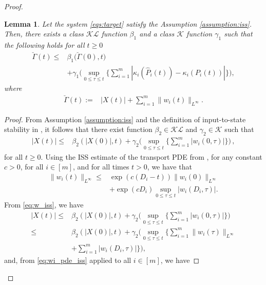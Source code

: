 \documentclass[letterpaper, 10 pt, conference]{ieeeconf}  %
\newtheorem{lemma}[theorem]{Lemma}
\begin{document}
\begin{proof}
\begin{lemma}\label{lem:lemma_3_of_6}
Let the system \eqref{eqs:target} satisfy the Assumption \ref{assumption:iss}. Then, there exists a class $\mathcal{KL}$ function $\beta_1$ and a class $\mathcal{K}$ function $\gamma_1$ such that the following holds for all $t \geq 0$
\begin{align}
    \breve{\Gamma}(t) \leq& \nonumber  \beta_1 \bigg( \breve{\Gamma}(0), t \bigg) \\ &+ \gamma_1 \bigg( \sup_{0 \leq \tau \leq t} \bigg\{ \sum_{i=1}^m |\kappa_i(\hat{P}_i(t)) - \kappa_i(P_i(t))| \bigg\} \bigg), \label{eq:lemma3_Gamma_bar}
\end{align}
where
\begin{align}
    \breve{\Gamma}(t) :=& |X(t)| + \sum_{i=1}^m \|w_i(t)\|_{L^\infty}. \label{eq:Gamma_bar_def}
\end{align}
\end{lemma}
\begin{proof}
From Assumption \ref{assumption:iss} and the definition of input-to-state stability in \cite{SontagISS:1995}, it follows that there exist function $\beta_2 \in \mathcal{KL}$ and $\gamma_2 \in \mathcal{K}$ such that
\begin{align}
    |X(t)| \leq& \beta_2(|X(0)|, t) + \gamma_2 \bigg( \sup_{0 \leq \tau \leq t} \bigg\{ \sum_{i=1}^m |w_i(0,\tau)| \bigg\} \bigg) \label{eq:w_iss}\,, 
\end{align}
for all $t \geq 0$. Using the ISS estimate of the transport PDE from \cite[Lemma 6]{Luke_Peijia:2025}, for any constant $c> 0$, for all $i \in [m]$, and for all times $t > 0$, we have that 
\begin{align}
    \|w_i(t)\|_{L^\infty} \leq& \exp(c(D_i-t)) \|w_i(0)\|_{L^\infty} \nonumber  \\ &+ \exp(cD_i) \sup_{0 \leq \tau \leq t} |w_i(D_i,\tau)|. \label{eq:wi_pde_iss}
\end{align}
From \eqref{eq:w_iss}, we have
\begin{align}
    |X(t)| \leq& \beta_2(|X(0)|, t) + \gamma_2 \bigg( \sup_{0 \leq \tau \leq t} \bigg\{ \sum_{i=1}^m |w_i(0,\tau)| \bigg\} \bigg) \nonumber \\
        \leq& \beta_2(|X(0)|, t) + \gamma_2 \bigg( \sup_{0 \leq \tau \leq t} \bigg\{ \sum_{i=1}^m \|w_i(\tau)\|_{L^\infty} \nonumber \\ & + \sum_{i=1}^m |w_i(D_i,\tau)| \bigg\} \bigg) \label{eq:lemma3_x_iss},
\end{align}
and, from \eqref{eq:wi_pde_iss} applied to all $i \in [m]$, we have

\end{proof}
\end{proof}
\end{document}
